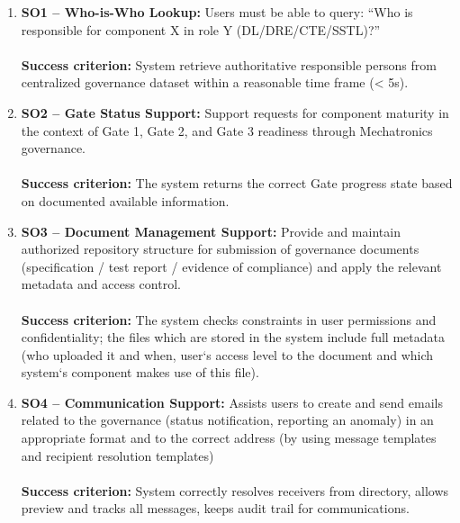 \begin{enumerate}
  
  \item \textbf{\textcolor[HTML]{003D99}{SO1 -- Who-is-Who Lookup:}} Users must be able to query: ``Who is responsible for component X in role Y (DL/DRE/CTE/SSTL)?'' 
  \\\\
  \textbf{Success criterion:} System retrieve authoritative responsible persons from centralized governance dataset within a reasonable time frame (< 5s).
  
  \vspace{0.3cm}
  
  \item \textbf{\textcolor[HTML]{003D99}{SO2 -- Gate Status Support:}} Support requests for component maturity in the context of Gate 1, Gate 2, and Gate 3 readiness through Mechatronics governance.
  \\\\
  \textbf{Success criterion:} The system returns the correct Gate progress state based on documented available information.
  
  \vspace{0.3cm}
  
  \item \textbf{\textcolor[HTML]{003D99}{SO3 -- Document Management Support:}} Provide and maintain authorized repository structure for submission of governance documents (specification / test report / evidence of compliance) and apply the relevant metadata and access control.
  \\\\
  \textbf{Success criterion:} The system checks constraints in user permissions and confidentiality; the files which are stored in the system include full metadata (who uploaded it and when, user‘s access level to the document and which system‘s component makes use of this file).
  
  \vspace{0.3cm}
  
  \item \textbf{\textcolor[HTML]{003D99}{SO4 -- Communication Support:}} Assists users to create and send emails related to the governance (status notification, reporting an anomaly) in an appropriate format and to the correct address (by using message templates and recipient resolution templates)
  \\\\
  \textbf{Success criterion:} System correctly resolves receivers from directory, allows preview and tracks all messages, keeps audit trail for communications.
  \vspace{0.3cm}
  

\end{enumerate}
